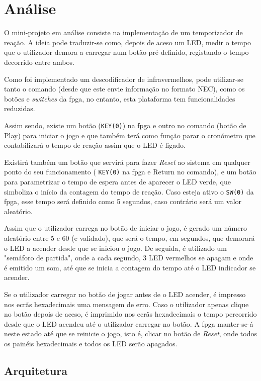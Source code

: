 \documentclass[a4paper,11pt,onecolumn]{report}
\begin{document}
\chapter{Análise}
\label{chap.analise}
O mini-projeto em análise consiste na implementação de um temporizador de reação. A ideia pode traduzir-se como, depois de aceso um LED, medir o tempo que o utilizador demora a carregar num botão pré-definido, registando o tempo decorrido entre ambos. 

Como foi implementado um descodificador de infravermelhos, pode utilizar-se tanto o comando (desde que este envie informação no formato NEC), como os botões e \textit{switches} da \ac{fpga}, no entanto, esta plataforma tem funcionalidades reduzidas.

Assim sendo, existe um botão (\texttt{KEY(0)}) na \ac{fpga} e outro no comando (botão de Play) para iniciar o jogo e que também terá como função parar o cronómetro que contabilizará o tempo de reação assim que o LED é ligado.

Existirá também um botão que servirá para fazer \textit{Reset} ao sistema em qualquer ponto do seu funcionamento ( \texttt{KEY(0)} na \ac{fpga} e Return no comando), e um botão para parametrizar o tempo de espera antes de aparecer o LED verde, que simboliza o início da contagem do tempo de reação. Caso esteja ativo o \texttt{SW(0)} da \ac{fpga}, esse tempo será definido como 5 segundos, caso contrário será um valor aleatório.

Assim que o utilizador carrega no botão de iniciar o jogo, é gerado um número aleatório entre 5 e 60 (e validado), que será o tempo, em segundos, que demorará o LED a acender desde que se iniciou o jogo. De seguida, é utilizado um "semáforo de partida", onde a cada segundo, 3 LED vermelhos se apagam e onde é emitido um som, até que se inicia a contagem do tempo até o LED indicador se acender.

Se o utilizador carregar no botão de jogar antes de o LED acender, é impresso nos ecrãs hexadecimais uma mensagem de erro. Caso o utilizador apenas clique no botão depois de aceso, é imprimido nos ecrãs hexadecimais o tempo percorrido desde que o LED acendeu até o utilizador carregar no botão. A \ac{fpga} manter-se-á neste estado até que se reinicie o jogo, isto é, clicar no botão de \textit{Reset}, onde todos os painéis hexadecimais e todos os LED serão apagados.

\section{Arquitetura}
\end{document}
